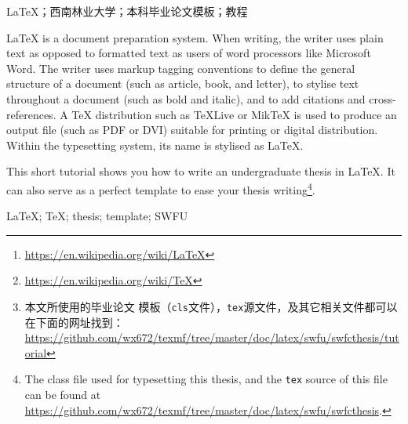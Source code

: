 
\begin{abstract} %
  \LaTeX{}\footnote{\url{https://en.wikipedia.org/wiki/LaTeX}}是一种基
  于\TeX{}\footnote{\url{https://en.wikipedia.org/wiki/TeX}}文件格式的
  排版系统，由美国电脑学家莱斯利·兰伯特在20世纪80年代初期开发。利用这种
  格式，即使用户没有排版和程序设计的知识，也可以充分利用\TeX{}所提供的
  强大功能，在几天，甚至几小时内生成很多具有书籍质量的印刷品。对于生成
  复杂表格和数学公式，这一点表现得尤为突出。因此它非常适用于生成高印刷
  质量的科技和数学类文档。这个系统同样适用于生成从简单如信件到完整如书
  籍的所有种类的文档\cite{wiki:latexcn}。

  本文对如何利用\LaTeX{}来撰写西南林业大学本科毕业论文做一个简要的介绍。
  读者也可以将本文作为毕业论文模板来使用\footnote{本文所使用的毕业论文
    模板（\texttt{cls}文件），\texttt{tex}源文件，及其它相关文件都可以
    在下面的网址找到：%
    \url{https://github.com/wx672/texmf/tree/master/doc/latex/swfu/swfcthesis/tutorial}}。
\end{abstract}

\begin{keyword} %
  \LaTeX{}；西南林业大学；本科毕业论文模板；教程
\end{keyword}

\begin{EAbstract} %
  \LaTeX{} is a document preparation system. When writing, the writer uses plain text as
  opposed to formatted text as users of word processors like Microsoft Word. The writer
  uses markup tagging conventions to define the general structure of a document (such as
  article, book, and letter), to stylise text throughout a document (such as bold and
  italic), and to add citations and cross-references. A \TeX{} distribution such as
  \TeX{}Live or Mik\TeX{} is used to produce an output file (such as PDF or DVI) suitable
  for printing or digital distribution. Within the typesetting system, its name is
  stylised as \LaTeX{}\cite{wiki:latex}.

  This short tutorial shows you how to write an undergraduate thesis in \LaTeX{}. It can
  also serve as a perfect template to ease your thesis writing\footnote{The class file
    used for typesetting this thesis, and the \texttt{tex} source of this file can be
    found at \url{https://github.com/wx672/texmf/tree/master/doc/latex/swfu/swfcthesis}.}.
\end{EAbstract}

\begin{EKeyword} %
  \LaTeX{}; \TeX{}; thesis; template; SWFU
\end{EKeyword}

